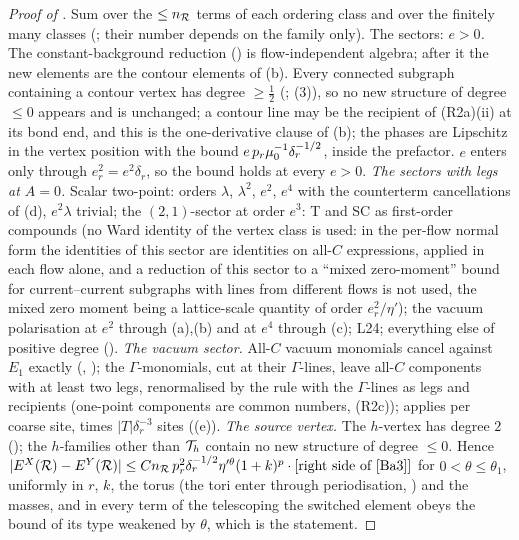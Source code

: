 \begin{proof}[Proof of ]
Sum  over the $\le n_{\mathcal R}$ terms of each ordering class and over the finitely many classes (\cite[(2.7)]{Ba3}; their number depends on the family only). The sectors:
\emph{$e>0$.} The constant-background reduction () is flow-independent algebra; after it the new elements are the contour elements of (b). Every connected subgraph containing a contour vertex has degree $\ge\frac12$ (\cite[(3.30)]{K1}; (3)), so no new structure of degree $\le0$ appears and  is unchanged; a contour line may be the recipient of (R2a)(ii) at its bond end, and this is the one-derivative clause of (b); the phases are Lipschitz in the vertex position with the bound $e\,p_r\mu_0^{-1}\delta_r^{-1/2}$, inside the prefactor. $e$ enters only through $e_r^2=e^2\delta_r$, so the bound holds at every $e>0$.
\emph{The sectors with legs at $A=0$.} Scalar two-point: orders $\lambda$, $\lambda^2$, $e^2$, $e^4$ with the counterterm cancellations of (d), $e^2\lambda$ trivial; the $(2,1)$-sector at order $e^3$: T and SC as first-order compounds (no Ward identity of the vertex class is used: in the per-flow normal form the identities of this sector are identities on all-$C$ expressions, applied in each flow alone, and a reduction of this sector to a ``mixed zero-moment'' bound for current--current subgraphs with lines from different flows is not used, the mixed zero moment being a lattice-scale quantity of order $e_r^2/\eta'$); the vacuum polarisation at $e^2$ through (a),(b) and at $e^4$ through (c); L24; everything else of positive degree (\cite[Cor.~2.3, (2.17)]{Ba3}).
\emph{The vacuum sector.} All-$C$ vacuum monomials cancel against $E_1$ exactly (, \cite[(3.35)]{K1}); the $\Gamma$-monomials, cut at their $\Gamma$-lines, leave all-$C$ components with at least two legs, renormalised by the rule with the $\Gamma$-lines as legs and recipients (one-point components are common numbers, (R2c));  applies per coarse site, times $|T|\delta_r^{-3}$ sites ((e)).
\emph{The source vertex.} The $h$-vertex has degree $2$ (); the $h$-families other than $\mathcal T_h$ contain no new structure of degree $\le0$.
Hence $|E^X(\cR)-E^Y(\cR)|\le Cn_\cR\,p_r^2\delta_r^{-1/2}\eta'^\theta(1+k)^p\cdot[\text{right side of \cite[(1.33)]{Ba3}}]$ for $0<\theta\le\theta_1$, uniformly in $r$, $k$, the torus (the tori enter through periodisation, ) and the masses, and in every term of the telescoping the switched element obeys the bound of its type weakened by $\theta$, which is the statement.
\end{proof}
